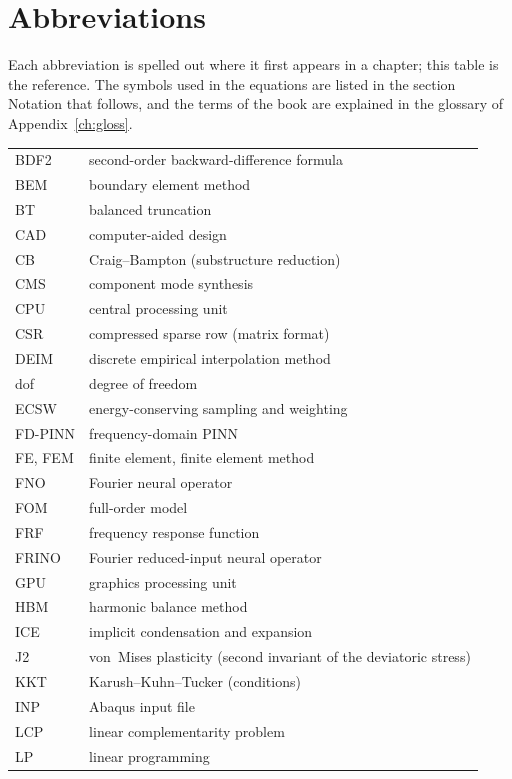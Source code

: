 \chapter*{Abbreviations}
Each abbreviation is spelled out where it first appears in a chapter; this table is the reference. The symbols used in the equations are listed in the section Notation that follows, and the terms of the book are explained in the glossary of Appendix~\ref{ch:gloss}.
\begingroup\small\renewcommand{\arraystretch}{1.12}
\noindent\begin{longtable}{@{}p{}p{}@{}}
\toprule
BDF2 & second-order backward-difference formula\\
BEM & boundary element method\\
BT & balanced truncation\\
CAD & computer-aided design\\
CB & Craig--Bampton (substructure reduction)\\
CMS & component mode synthesis\\
CPU & central processing unit\\
CSR & compressed sparse row (matrix format)\\
DEIM & discrete empirical interpolation method\\
dof & degree of freedom\\
ECSW & energy-conserving sampling and weighting\\
FD-PINN & frequency-domain PINN\\
FE, FEM & finite element, finite element method\\
FNO & Fourier neural operator\\
FOM & full-order model\\
FRF & frequency response function\\
FRINO & Fourier reduced-input neural operator\\
GPU & graphics processing unit\\
HBM & harmonic balance method\\
ICE & implicit condensation and expansion\\
J2 & von~Mises plasticity (second invariant of the deviatoric stress)\\
KKT & Karush--Kuhn--Tucker (conditions)\\
INP & Abaqus input file\\
LCP & linear complementarity problem\\
LP & linear programming\\

\end{longtable}
